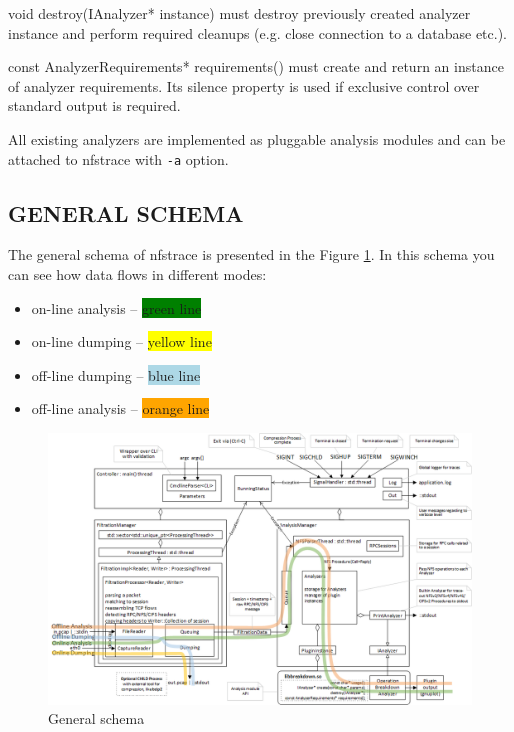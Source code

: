 \documentclass[oneside]{article}
\newcommand{\code}[1]{\texttt{#1}}
\newcommand*{\textfile}[1]{\textsf{#1}}
\newcommand*{\textprog}[1]{\textfile{#1}}
\begin{document}
\textprog{void destroy(IAnalyzer* instance)} must destroy previously created
analyzer instance and perform required cleanups (e.g. close connection to a
database etc.).

\textprog{const AnalyzerRequirements* requirements()} must create and return an
instance of analyzer requirements. Its silence property is used if exclusive
control over standard output is required.

All existing analyzers are implemented as pluggable analysis modules and can be
attached to \textprog{nfstrace} with \code{-a} option.

\subsection{GENERAL SCHEMA}

\begin{minipage}[t]{\linewidth}
The general schema of \textprog{nfstrace} is presented in the Figure \ref{fig:generalschema}.
In this schema you can see how data flows in different modes: 
\begin{itemize}
    \item on-line analysis –  \colorbox{green}{green line}
    \item on-line dumping –  \colorbox{yellow}{yellow line}
    \item off-line dumping –  \colorbox{lightblue}{blue line}
    \item off-line analysis –  \colorbox{orange}{orange line}
\end{itemize} 
\end{minipage}

\newpage

\begin{figure}
\includegraphics[width=\linewidth]{./pictures/general-structure.png}
\caption{General schema}
\label{General schema}
\centering
\label{fig:generalschema}
\end{figure}

\clearpage

\end{document}
